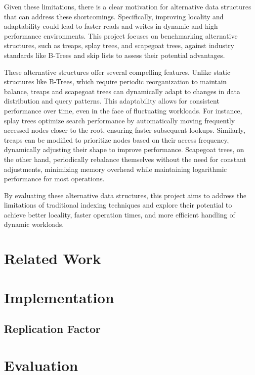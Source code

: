 \documentclass[sigconf]{acmart}
\begin{document}
Given these limitations, there is a clear motivation for alternative data structures that can address these shortcomings. Specifically, improving locality and adaptability could lead to faster reads and writes in dynamic and high-performance environments. This project focuses on benchmarking alternative structures, such as treaps, splay trees, and scapegoat trees, against industry standards like B-Trees and skip lists to assess their potential advantages.

These alternative structures offer several compelling features. Unlike static structures like B-Trees, which require periodic reorganization to maintain balance, treaps and scapegoat trees can dynamically adapt to changes in data distribution and query patterns. This adaptability allows for consistent performance over time, even in the face of fluctuating workloads. For instance, splay trees optimize search performance by automatically moving frequently accessed nodes closer to the root, ensuring faster subsequent lookups. Similarly, treaps can be modified to prioritize nodes based on their access frequency, dynamically adjusting their shape to improve performance. Scapegoat trees, on the other hand, periodically rebalance themselves without the need for constant adjustments, minimizing memory overhead while maintaining logarithmic performance for most operations.

By evaluating these alternative data structures, this project aims to address the limitations of traditional indexing techniques and explore their potential to achieve better locality, faster operation times, and more efficient handling of dynamic workloads.


\section{Related Work}


\section{Implementation}

\subsection{Replication Factor}

\section{Evaluation}
\end{document}
